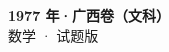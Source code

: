 \documentclass[zihao=-4, a4paper]{ctexart}
\begin{document}
\begin{center}
  {\Large\bfseries 1977 年·广西卷（文科）}\\[4pt]
  {\large 数学 · 试题版}
\end{center}
\medskip
{}

\end{document}
